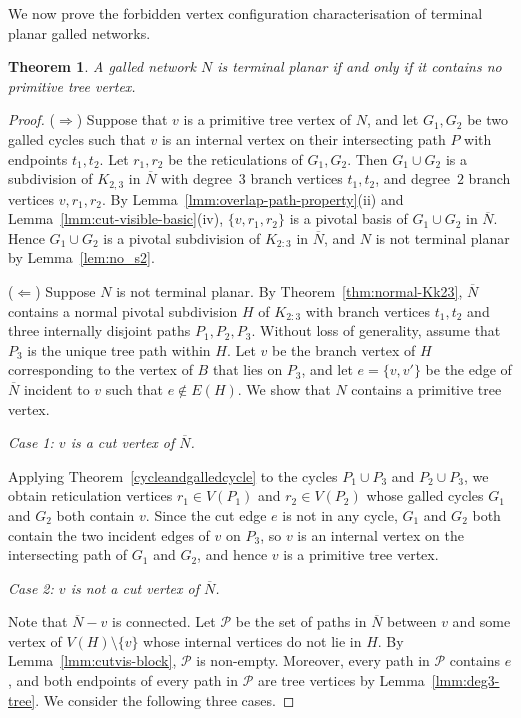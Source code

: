 \documentclass[pdflatex,sn-mathphys-num]{sn-jnl}
\theoremstyle{thmstyleone}%
\newtheorem{theorem}{Theorem}%
\theoremstyle{thmstyletwo}%
\theoremstyle{thmstylethree}%
\begin{document}
We now prove the forbidden vertex configuration characterisation of terminal planar galled networks. 


\begin{theorem}\label{noter2gall}
A galled network $N$ is terminal planar if and only if it contains no primitive tree vertex.
\end{theorem}


\begin{proof}
($\Rightarrow$) Suppose that $v$ is a primitive tree vertex of ${N}$, and let $G_1, G_2$ be two galled cycles such that $v$ is an internal vertex on their intersecting path $P$ with endpoints $t_1, t_2$. Let $r_1, r_2$ be the reticulations of $G_1, G_2$. Then $G_1 \cup G_2$ is a subdivision of $K_{2,3}$ in $\overline{N}$ with degree~$3$ branch vertices $t_1, t_2$, and degree~$2$ branch vertices $v, r_1, r_2$. By Lemma~\ref{lmm:overlap-path-property}(ii) and Lemma~\ref{lmm:cut-visible-basic}(iv), $\{v,r_1,r_2\}$ is a pivotal basis of $G_1\cup G_2$ in $\overline{N}$. Hence $G_1\cup G_2$ is a pivotal subdivision of $K_{2:3}$ in $\overline{N}$, and $N$ is not terminal planar by Lemma~\ref{lem:no_s2}.
\smallskip

($\Leftarrow$) Suppose $N$ is not terminal planar. By Theorem~\ref{thm:normal-Kk23}, $\overline{N}$ contains a normal pivotal subdivision $H$ of $K_{2:3}$ with branch vertices $t_1, t_2$ and three internally disjoint paths $P_1, P_2, P_3$. Without loss of generality, assume that $P_3$ is the unique tree path within $H$. Let $v$ be the branch vertex of $H$ corresponding to the vertex of $B$ that lies on $P_3$, and let $e=\{v,v'\}$ be the edge of $\overline{N}$ incident to $v$ such that $e \notin E(H)$. We show that ${N}$ contains a primitive tree vertex.

\smallskip
\noindent\textit{Case 1: $v$ is a cut vertex of $\overline{N}$.}

Applying Theorem~\ref{cycleandgalledcycle} to the cycles $P_1\cup P_3$ and $P_2\cup P_3$, we obtain reticulation vertices $r_1\in V(P_1)$ and $r_2\in V(P_2)$ whose galled cycles $G_1$ and $G_2$ both contain $v$. Since the cut edge $e$ is not in any cycle, $G_1$ and $G_2$ both contain the two incident edges of $v$ on $P_3$, so $v$ is an internal vertex on the intersecting path of $G_1$ and $G_2$, and hence $v$ is a primitive tree vertex.

\smallskip
\noindent\textit{Case 2: $v$ is not a cut vertex of $\overline{N}$.}

Note that $\overline{N}-v$ is connected. Let $\mathcal{P}$ be the set of paths in $\overline{N}$ between $v$ and some vertex of $V(H)\setminus\{v\}$ whose internal vertices do not lie in $H$. By Lemma~\ref{lmm:cutvis-block}, $\mathcal{P}$ is non-empty. Moreover, every path in $\mathcal{P}$ contains $e$, and both endpoints of every path in $\mathcal{P}$ are tree vertices by Lemma~\ref{lmm:deg3-tree}. We consider the following three cases.


\end{proof}
\end{document}
